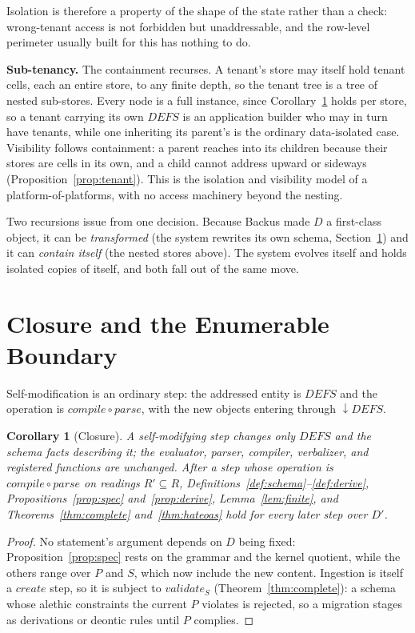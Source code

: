 \documentclass[10pt,twocolumn]{article}
\theoremstyle{plain}
\newtheorem{corollary}{Corollary}
\theoremstyle{definition}
\begin{document}
\noindent Isolation is therefore a property of the shape of the state rather than a check: wrong-tenant access is not forbidden but unaddressable, and the row-level perimeter usually built for this has nothing to do.

\smallskip\noindent\textbf{Sub-tenancy.} The containment recurses. A tenant's store may itself hold tenant cells, each an entire store, to any finite depth, so the tenant tree is a tree of nested sub-stores. Every node is a full instance, since Corollary~\ref{cor:closure} holds per store, so a tenant carrying its own $\mathit{DEFS}$ is an application builder who may in turn have tenants, while one inheriting its parent's is the ordinary data-isolated case. Visibility follows containment: a parent reaches into its children because their stores are cells in its own, and a child cannot address upward or sideways (Proposition~\ref{prop:tenant}). This is the isolation and visibility model of a platform-of-platforms, with no access machinery beyond the nesting.

Two recursions issue from one decision. Because Backus made $D$ a first-class object, it can be \emph{transformed} (the system rewrites its own schema, Section~\ref{sec:boundary}) and it can \emph{contain itself} (the nested stores above). The system evolves itself and holds isolated copies of itself, and both fall out of the same move.


\section{Closure and the Enumerable Boundary}\label{sec:boundary}

Self-modification is an ordinary step: the addressed entity is $\mathit{DEFS}$ and the operation is $\mathit{compile}\circ\mathit{parse}$, with the new objects entering through $\downarrow\!\mathit{DEFS}$.

\begin{corollary}[Closure]\label{cor:closure}
A self-modifying step changes only $\mathit{DEFS}$ and the schema facts describing it; the evaluator, parser, compiler, verbalizer, and registered functions are unchanged. After a step whose operation is $\mathit{compile}\circ\mathit{parse}$ on readings $R'\subseteq R$, Definitions~\ref{def:schema}--\ref{def:derive}, Propositions~\ref{prop:spec} and~\ref{prop:derive}, Lemma~\ref{lem:finite}, and Theorems~\ref{thm:complete} and~\ref{thm:hateoas} hold for every later step over $D'$.
\end{corollary}
\begin{proof}
No statement's argument depends on $D$ being fixed: Proposition~\ref{prop:spec} rests on the grammar and the kernel quotient, while the others range over $P$ and $S$, which now include the new content. Ingestion is itself a $\mathit{create}$ step, so it is subject to $\mathit{validate}_S$ (Theorem~\ref{thm:complete}): a schema whose alethic constraints the current $P$ violates is rejected, so a migration stages as derivations or deontic rules until $P$ complies.
\end{proof}
\end{document}
